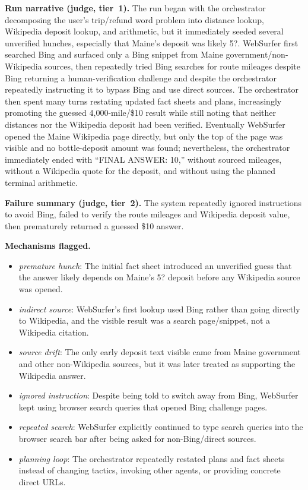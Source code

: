 \textbf{Run narrative (judge, tier~1).} The run began with the orchestrator decomposing the user's trip/refund word problem into distance lookup, Wikipedia deposit lookup, and arithmetic, but it immediately seeded several unverified hunches, especially that Maine's deposit was likely 5?. WebSurfer first searched Bing and surfaced only a Bing snippet from Maine government/non-Wikipedia sources, then repeatedly tried Bing searches for route mileages despite Bing returning a human-verification challenge and despite the orchestrator repeatedly instructing it to bypass Bing and use direct sources. The orchestrator then spent many turns restating updated fact sheets and plans, increasingly promoting the guessed 4,000-mile/\$10 result while still noting that neither distances nor the Wikipedia deposit had been verified. Eventually WebSurfer opened the Maine Wikipedia page directly, but only the top of the page was visible and no bottle-deposit amount was found; nevertheless, the orchestrator immediately ended with ``FINAL ANSWER: 10,'' without sourced mileages, without a Wikipedia quote for the deposit, and without using the planned terminal arithmetic.

\textbf{Failure summary (judge, tier~2).} The system repeatedly ignored instructions to avoid Bing, failed to verify the route mileages and Wikipedia deposit value, then prematurely returned a guessed \$10 answer.

\textbf{Mechanisms flagged.}
\begin{itemize}
  \item \emph{premature hunch}: The initial fact sheet introduced an unverified guess that the answer likely depends on Maine's 5? deposit before any Wikipedia source was opened.
  \item \emph{indirect source}: WebSurfer's first lookup used Bing rather than going directly to Wikipedia, and the visible result was a search page/snippet, not a Wikipedia citation.
  \item \emph{source drift}: The only early deposit text visible came from Maine government and other non-Wikipedia sources, but it was later treated as supporting the Wikipedia answer.
  \item \emph{ignored instruction}: Despite being told to switch away from Bing, WebSurfer kept using browser search queries that opened Bing challenge pages.
  \item \emph{repeated search}: WebSurfer explicitly continued to type search queries into the browser search bar after being asked for non-Bing/direct sources.
  \item \emph{planning loop}: The orchestrator repeatedly restated plans and fact sheets instead of changing tactics, invoking other agents, or providing concrete direct URLs.
\end{itemize}

